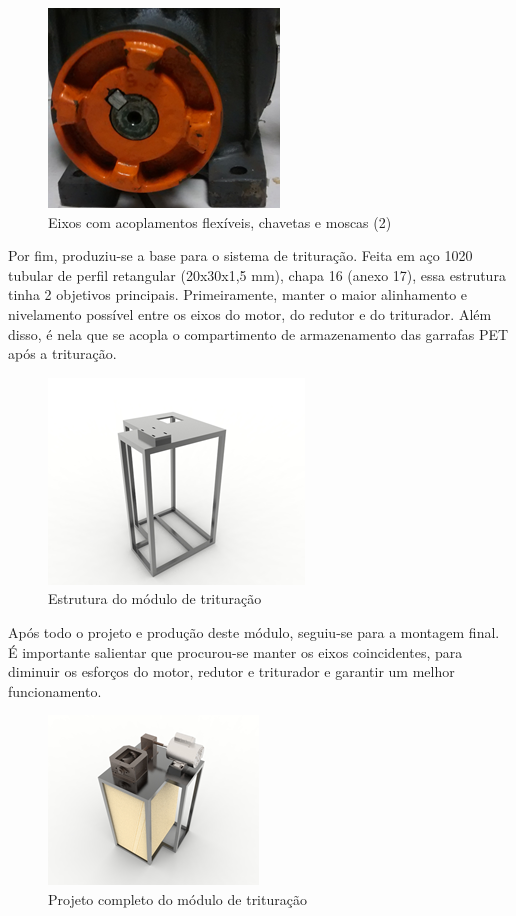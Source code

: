 \newpage

\begin{figure}[!h]
	\centering
		\includegraphics[scale=0.6]{figuras/estrutura/18(2).png}
	\caption{Eixos com acoplamentos flexíveis, chavetas e moscas (2)}
\end{figure}

Por fim, produziu-se a base para o sistema de trituração. Feita em aço 1020 tubular de perfil retangular (20x30x1,5 mm), chapa 16 (anexo 17), essa estrutura tinha 2 objetivos principais. Primeiramente, manter o maior alinhamento e nivelamento possível entre os eixos do motor, do redutor e do triturador. Além disso, é nela que se acopla o compartimento de armazenamento das garrafas PET após a trituração.

\begin{figure}[!h]
	\centering
		\includegraphics[scale=1.1]{figuras/estrutura/19.png}
	\caption{Estrutura do módulo de trituração}
\end{figure}

Após todo o projeto e produção deste módulo, seguiu-se para a montagem final. É importante salientar que procurou-se manter os eixos coincidentes, para diminuir os esforços do motor, redutor e triturador e garantir um melhor funcionamento.

\begin{figure}[!h]
	\centering
		\includegraphics[scale=1.1]{figuras/estrutura/20(1).png}
	\caption{Projeto completo do módulo de trituração}
\end{figure}

